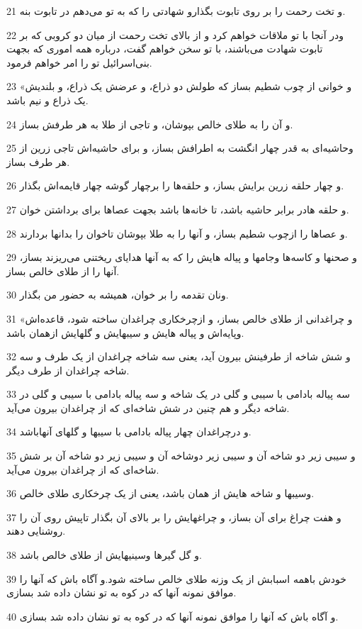 \par 21 و تخت رحمت را بر روی تابوت بگذارو شهادتی را که به تو می‌دهم در تابوت بنه.
\par 22 ودر آنجا با تو ملاقات خواهم کرد و از بالای تخت رحمت از میان دو کروبی که بر تابوت شهادت می‌باشند، با تو سخن خواهم گفت، درباره همه اموری که بجهت بنی‌اسرائیل تو را امر خواهم فرمود.
\par 23 «و خوانی از چوب شطیم بساز که طولش دو ذراع، و عرضش یک ذراع، و بلندیش یک ذراع و نیم باشد. 
\par 24 و آن را به طلای خالص بپوشان، و تاجی از طلا به هر طرفش بساز.
\par 25 وحاشیه‌ای به قدر چهار انگشت به اطرافش بساز، و برای حاشیه‌اش تاجی زرین از هر طرف بساز.
\par 26 و چهار حلقه زرین برایش بساز، و حلقه‌ها را برچهار گوشه چهار قایمه‌اش بگذار.
\par 27 و حلقه هادر برابر حاشیه باشد، تا خانه‌ها باشد بجهت عصاها برای برداشتن خوان.
\par 28 و عصاها را ازچوب شطیم بساز، و آنها را به طلا بپوشان تاخوان را بدانها بردارند.
\par 29 و صحنها و کاسه‌ها وجامها و پیاله هایش را که به آنها هدایای ریختنی می‌ریزند بساز، آنها را از طلای خالص بساز.
\par 30 ونان تقدمه را بر خوان، همیشه به حضور من بگذار.
\par 31 «و چراغدانی از طلای خالص بساز، و ازچرخکاری چراغدان ساخته شود، قاعده‌اش وپایه‌اش و پیاله هایش و سیبهایش و گلهایش ازهمان باشد.
\par 32 و شش شاخه از طرفینش بیرون آید، یعنی سه شاخه چراغدان از یک طرف و سه شاخه چراغدان از طرف دیگر.
\par 33 سه پیاله بادامی با سیبی و گلی در یک شاخه و سه پیاله بادامی با سیبی و گلی در شاخه دیگر و هم چنین در شش شاخه‌ای که از چراغدان بیرون می‌آید.
\par 34 و درچراغدان چهار پیاله بادامی با سیبها و گلهای آنهاباشد.
\par 35 و سیبی زیر دو شاخه آن و سیبی زیر دوشاخه آن و سیبی زیر دو شاخه آن بر شش شاخه‌ای که از چراغدان بیرون می‌آید.
\par 36 وسیبها و شاخه هایش از همان باشد، یعنی از یک چرخکاری طلای خالص.
\par 37 و هفت چراغ برای آن بساز، و چراغهایش را بر بالای آن بگذار تاپیش روی آن را روشنایی دهند.
\par 38 و گل گیرها وسینیهایش از طلای خالص باشد.
\par 39 خودش باهمه اسبابش از یک وزنه طلای خالص ساخته شود.و آگاه باش که آنها را موافق نمونه آنها که در کوه به تو نشان داده شد بسازی.
\par 40 و آگاه باش که آنها را موافق نمونه آنها که در کوه به تو نشان داده شد بسازی.
 
